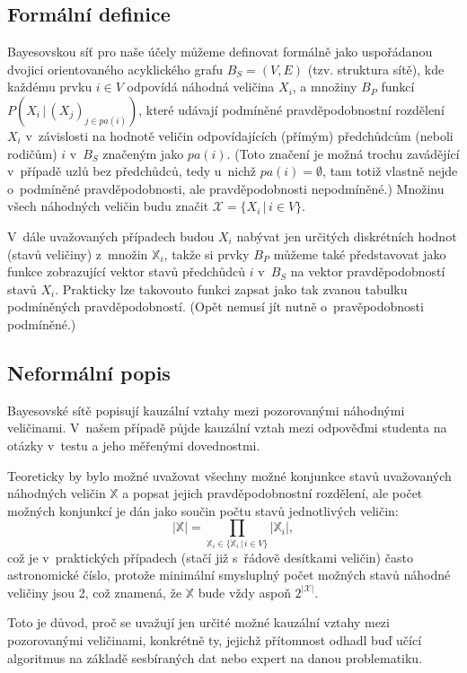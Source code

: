 \documentclass[a4paper,twoside,12pt]{scrbook}
\begin{document}
\subsection{Formální definice}
Bayesovskou síť pro naše účely můžeme definovat formálně jako uspořádanou dvojici orientovaného acyklického grafu $B_S = (V,E)$ (tzv. struktura sítě), kde každému prvku $i \in V$ odpovídá náhodná veličina $X_i$, a množiny $B_P$  funkcí $P(X_i\,|\,(X_j)_{j\in pa(i)})$, které udávají podmíněné pravděpodobnostní rozdělení $X_i$ v~závislosti na hodnotě veličin odpovídajících (přímým) předchůdcům (neboli rodičům) $i$ v~$B_S$ značeným jako $pa(i)$. (Toto značení je možná trochu zavádějící v~případě uzlů bez předchůdců, tedy u~nichž $pa(i) = \emptyset$, tam totiž vlastně nejde o~podmíněné pravděpodobnosti, ale pravděpodobnosti nepodmíněné.) Množinu všech náhodných veličin budu značit $\mathcal{X}=\{X_i\,|\,i \in V\}$.

V~dále uvažovaných případech budou $X_i$ nabývat jen určitých diskrétních hodnot (stavů veličiny) z~množin $\mathbb{X}_i$, takže si prvky $B_P$ můžeme také představovat jako funkce zobrazující vektor stavů předchůdců $i$ v~$B_S$ na vektor pravděpodobností stavů $X_i$. Prakticky lze takovouto funkci zapsat jako tak zvanou tabulku podmíněných pravděpodobností. (Opět nemusí jít nutně o~pravěpodobnosti podmíněné.)

\subsection{Neformální popis}
Bayesovské sítě popisují kauzální vztahy mezi pozorovanými náhodnými veličinami. V~našem případě půjde kauzální vztah mezi odpověďmi studenta na otázky v~testu a jeho měřenými dovednostmi.

Teoreticky by bylo možné uvažovat všechny možné konjunkce stavů uvažovaných náhodných veličin $\mathbb{X}$ a popsat jejich pravděpodobnostní rozdělení, ale počet možných konjunkcí je dán jako součin počtu stavů jednotlivých veličin:
\begin{equation}
	\label{eq:conjunctions_cardinality}
	|\mathbb{X}| = \prod_{\mathbb{X}_i \in \{\mathbb{X}_i\,|\,i \in V\}} \left|\mathbb{X}_i\right|,
\end{equation}
což je v~praktických případech (stačí již s~řádově desítkami veličin) často astronomické číslo, protože minimální smysluplný počet možných stavů náhodné veličiny jsou 2, což znamená, že $\mathbb{X}$ bude vždy aspoň $2^{\left|\mathcal{X}\right|}$.

Toto je důvod, proč se uvažují jen určité možné kauzální vztahy mezi pozorovanými veličinami, konkrétně ty, jejichž přítomnost odhadl buď učící algoritmus na základě sesbíraných dat nebo expert na danou problematiku.
\end{document}
